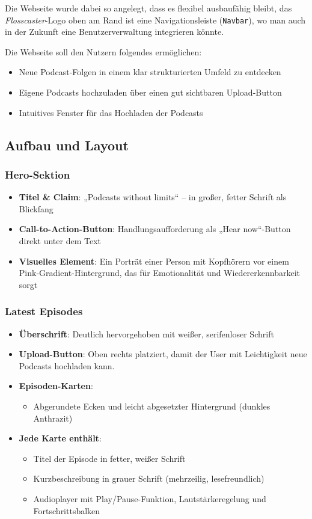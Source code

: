\documentclass{article}
\begin{document}
Die Webseite wurde dabei so angelegt, dass es flexibel ausbaufähig bleibt, das \textit{Flosscaster}-Logo oben am Rand ist eine Navigationsleiste (\texttt{Navbar}), wo man auch in der Zukunft eine Benutzerverwaltung integrieren könnte.

Die Webseite soll den Nutzern folgendes ermöglichen:

\begin{itemize}
  \item Neue Podcast-Folgen in einem klar strukturierten Umfeld zu entdecken
  \item Eigene Podcasts hochzuladen über einen gut sichtbaren Upload-Button
  \item Intuitives Fenster für das Hochladen der Podcasts
\end{itemize}

\subsection{Aufbau und Layout}
\subsubsection{Hero-Sektion}
\begin{itemize}
  \item \textbf{Titel \& Claim}: „Podcasts without limits“ – in großer, fetter Schrift als Blickfang
  \item \textbf{Call-to-Action-Button}: Handlungsaufforderung als „Hear now“-Button direkt unter dem Text
  \item \textbf{Visuelles Element}: Ein Porträt einer Person mit Kopfhörern vor einem Pink-Gradient-Hintergrund, das für Emotionalität und Wiedererkennbarkeit sorgt
\end{itemize}

\subsubsection{Latest Episodes}
\begin{itemize}
  \item \textbf{Überschrift}: Deutlich hervorgehoben mit weißer, serifenloser Schrift
  \item \textbf{Upload-Button}: Oben rechts platziert, damit der User mit Leichtigkeit neue Podcasts hochladen kann.
  \item \textbf{Episoden-Karten}:
  \begin{itemize}
    \item Abgerundete Ecken und leicht abgesetzter Hintergrund (dunkles Anthrazit)
  \end{itemize}
  \item \textbf{Jede Karte enthält}:
  \begin{itemize}
    \item Titel der Episode in fetter, weißer Schrift
    \item Kurzbeschreibung in grauer Schrift (mehrzeilig, lesefreundlich)
    \item Audioplayer mit Play/Pause-Funktion, Lautstärkeregelung und Fortschrittsbalken
  \end{itemize}
\end{itemize}
\end{document}
